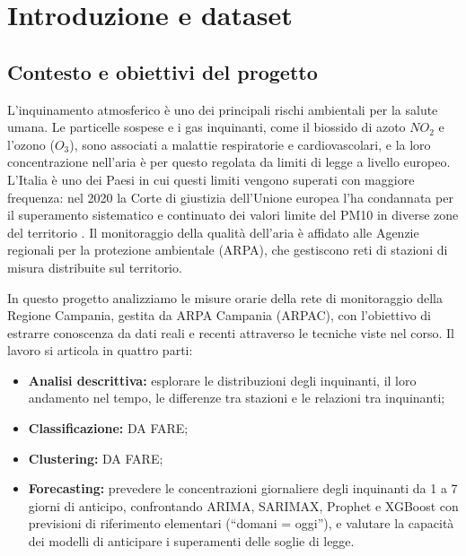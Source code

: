 \documentclass[11pt]{report}
\begin{document}
\chapter{Introduzione e dataset}
\label{cap:dataset}

\section{Contesto e obiettivi del progetto}
\label{sec:obiettivi}

L'inquinamento atmosferico è uno dei principali rischi ambientali per la salute
umana. Le particelle sospese e i gas inquinanti, come il biossido di azoto
\(NO_{2}\) e l'ozono (\(O_{3}\)), sono associati a malattie respiratorie e
cardiovascolari, e la loro concentrazione nell'aria è per questo regolata da
limiti di legge a livello europeo. L'Italia è uno dei Paesi in cui questi
limiti vengono superati con maggiore frequenza: nel 2020 la Corte di giustizia
dell'Unione europea l'ha condannata per il superamento sistematico e continuato
dei valori limite del PM10 in diverse zone del territorio \cite{cgue}. Il
monitoraggio della qualità dell'aria è affidato alle Agenzie regionali per la
protezione ambientale (ARPA), che gestiscono reti di stazioni di misura
distribuite sul territorio.

In questo progetto analizziamo le misure orarie della rete di monitoraggio
della Regione Campania, gestita da ARPA Campania (ARPAC), con l'obiettivo di
estrarre conoscenza da dati reali e recenti attraverso le tecniche viste nel
corso. Il lavoro si articola in quattro parti:
\begin{itemize}
  \item \textbf{Analisi descrittiva:} esplorare le distribuzioni degli
        inquinanti, il loro andamento nel tempo, le differenze tra stazioni e le relazioni tra inquinanti;
  \item \textbf{Classificazione:} DA FARE;
  \item \textbf{Clustering:} DA FARE;
  \item \textbf{Forecasting:} prevedere le concentrazioni giornaliere degli
        inquinanti da 1 a 7 giorni di anticipo, confrontando ARIMA, SARIMAX,
        Prophet e XGBoost con previsioni di riferimento elementari (``domani =
        oggi''), e valutare la capacità dei modelli di anticipare i superamenti
        delle soglie di legge.
\end{itemize}
\end{document}

